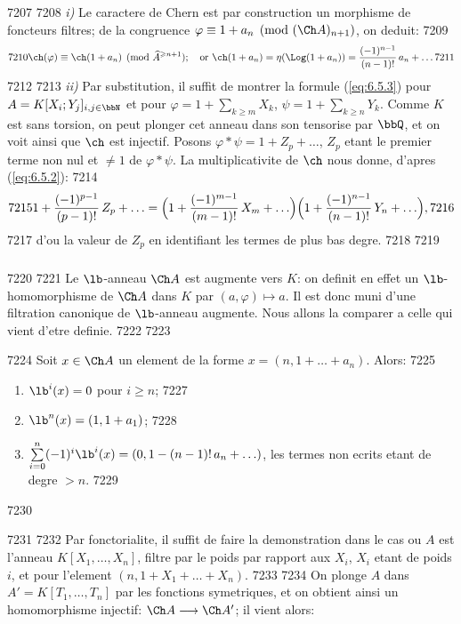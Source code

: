   7207	
  7208	\emph{i)} Le caractere de Chern est par construction un morphisme de foncteurs filtres; de la congruence $\varphi \equiv 1 + a_n \pmod{(\Ch A)_{n+1}}$, on deduit:
  7209	\[
  7210	\ch(\varphi) \equiv \ch(1+a_n) \pmod{\widehat{A}^{\geqslant n+1}}; \quad \text{or } \ch(1+a_n) = \eta(\Log(1+a_n)) = \frac{(-1)^{n-1}}{(n-1)!}\, a_n + \ldots
  7211	\]
  7212	
  7213	\emph{ii)} Par substitution, il suffit de montrer la formule (\ref{eq:6.5.3}) pour $A = K[X_i; Y_j]_{i,j \in \bbN}$ et pour $\varphi = 1 + \sum_{k \geqslant m} X_k$, $\psi = 1 + \sum_{k \geqslant n} Y_k$. Comme $K$ est sans torsion, on peut plonger cet anneau dans son tensorise par $\bbQ$, et on voit ainsi que $\ch$ est injectif. Posons $\varphi * \psi = 1 + Z_p + \ldots$, $Z_p$ etant le premier terme non nul et $\neq 1$ de $\varphi * \psi$. La multiplicativite de $\ch$ nous donne, d'apres (\ref{eq:6.5.2}):
  7214	\[
  7215	1 + \frac{(-1)^{p-1}}{(p-1)!}\, Z_p + \ldots = \Bigl(1 + \frac{(-1)^{m-1}}{(m-1)!}\, X_m + \ldots\Bigr)\Bigl(1 + \frac{(-1)^{n-1}}{(n-1)!}\, Y_n + \ldots\Bigr),
  7216	\]
  7217	d'ou la valeur de $Z_p$ en identifiant les termes de plus bas degre.
  7218	
  7219	\subsubsection{}
  7220	
  7221	Le $\lb$-anneau $\Ch A$ est augmente vers $K$: on definit en effet un $\lb$-homomorphisme de $\Ch A$ dans $K$ par $(a, \varphi) \longmapsto a$. Il est donc muni d'une filtration canonique de $\lb$-anneau augmente. Nous allons la comparer a celle qui vient d'etre definie.
  7222	
  7223	\begin{prop}[6.6.1]
  7224	Soit $x \in \Ch A$ un element de la forme $x = (n, 1+\ldots+a_n)$. Alors:
  7225	\begin{enumerate}[label=\roman*)]
  7226	\item $\lb^i(x) = 0$ pour $i \geqslant n$;
  7227	\item $\lb^n(x) = (1, 1+a_1)$;
  7228	\item $\sum\limits_{i=0}^{n} (-1)^i \lb^i(x) = (0, 1-(n-1)!\, a_n + \ldots)$, les termes non ecrits etant de degre $> n$.
  7229	\end{enumerate}
  7230	\end{prop}
  7231	
  7232	Par fonctorialite, il suffit de faire la demonstration dans le cas ou $A$ est l'anneau $K[X_1, \ldots, X_n]$, filtre par le poids par rapport aux $X_i$, $X_i$ etant de poids $i$, et pour l'element $(n, 1+X_1+\ldots+X_n)$.
  7233	
  7234	On plonge $A$ dans $A' = K[T_1, \ldots, T_n]$ par les fonctions symetriques, et on obtient ainsi un homomorphisme injectif: $\Ch A \longrightarrow \Ch A'$; il vient alors:
